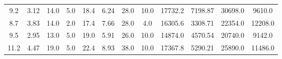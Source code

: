 \documentclass{article}
\begin{document}
\begin{table}[]
\begin{tabular}{cccccccccccc}
	     		9.2                        & 3.12                         & 14.0                     & 5.0                      & 18.4                      & 6.24                         & 28.0                     & 10.0                     & 17732.2                   & 7198.87                      & 30698.0                  & 9610.0                   \\
	     		8.7                        & 3.83                         & 14.0                     & 2.0                      & 17.4                      & 7.66                         & 28.0                     & 4.0                      & 16305.6                   & 3308.71                      & 22354.0                  & 12208.0                  \\
	     		9.5                        & 2.95                         & 13.0                     & 5.0                      & 19.0                      & 5.91                         & 26.0                     & 10.0                     & 14874.0                   & 4570.54                      & 20740.0                  & 9142.0                   \\
	     		11.2                       & 4.47                         & 19.0                     & 5.0                      & 22.4                      & 8.93                         & 38.0                     & 10.0                     & 17367.8                   & 5290.21                      & 25890.0                  & 11486.0                 
	     	\end{tabular}
	     \end{table}
	     
\end{document}
